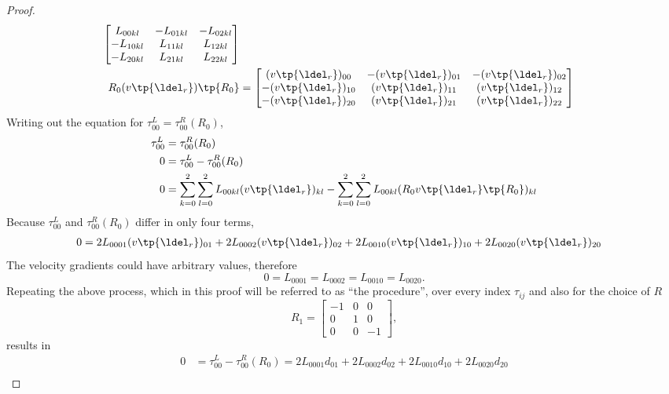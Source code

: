 \begin{proof}
\begin{align}
\begin{bmatrix}
            L_{00kl} & -L_{01kl} & -L_{02kl} \\
           -L_{10kl} &  L_{11kl} &  L_{12kl} \\
           -L_{20kl} &  L_{21kl} &  L_{22kl}
        \end{bmatrix} \\
        R_0(v\tp{\ldel_r})\tp{R_0} &= \begin{bmatrix}
            (v\tp{\ldel_r})_{00} & -(v\tp{\ldel_r})_{01} & -(v\tp{\ldel_r})_{02} \\
           -(v\tp{\ldel_r})_{10} &  (v\tp{\ldel_r})_{11} &  (v\tp{\ldel_r})_{12} \\
           -(v\tp{\ldel_r})_{20} &  (v\tp{\ldel_r})_{21} &  (v\tp{\ldel_r})_{22}
        \end{bmatrix}
    \end{align}
    Writing out the equation for $\tau^L_{00} = \tau^R_{00}(R_0)$,
    \begin{align}
        \tau^L_{00} &= \tau^R_{00}(R_0) \\
        0 &= \tau^L_{00} - \tau^R_{00}(R_0) \\
        0 &= \sum_{k=0}^2 \sum_{l=0}^2 L_{00kl} (v \tp{\ldel_r})_{kl} 
             - \sum_{k=0}^2 \sum_{l=0}^2 L_{00kl} (R_0 v \tp{\ldel_r} \tp{R_0})_{kl}
    \end{align}
    Because $\tau^L_{00}$ and $\tau^R_{00}(R_0)$ differ in only four terms,
    \begin{align}
        0 &=  2L_{0001}(v\tp{\ldel_r})_{01} + 2L_{0002}(v\tp{\ldel_r})_{02} + 2L_{0010}(v\tp{\ldel_r})_{10} + 2L_{0020}(v\tp{\ldel_r})_{20}
    \end{align}
    The velocity gradients could have arbitrary values, therefore
    \begin{equation}
        0 = L_{0001} = L_{0002} = L_{0010} = L_{0020}.
    \end{equation}
    Repeating the above process, which in this proof will be referred to as ``the procedure'',
    over every index $\tau_{ij}$ and also for the choice of $R$
    \begin{equation}
        R_1 = \begin{bmatrix}
        -1 & 0 & 0 \\
        0 &  1 & 0 \\
        0 & 0 & -1
    \end{bmatrix},
    \end{equation}
    results in
    \begin{align}
        0 &= \tau^L_{00} - \tau^R_{00}(R_0) = 2L_{0001}d_{01} + 2L_{0002}d_{02} + 2L_{0010}d_{10} + 2L_{0020}d_{20} \\

\end{align}
\end{proof}
